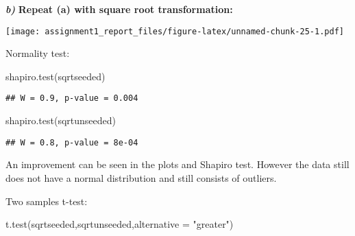 \documentclass[
]{article}
\newenvironment{Shaded}{\begin{snugshade}}{\end{snugshade}}
\newcommand{\AttributeTok}[1]{\textcolor[rgb]{0.77,0.63,0.00}{#1}}
\newcommand{\CommentTok}[1]{\textcolor[rgb]{0.56,0.35,0.01}{\textit{#1}}}
\newcommand{\FunctionTok}[1]{\textcolor[rgb]{0.00,0.00,0.00}{#1}}
\newcommand{\NormalTok}[1]{#1}
\newcommand{\OtherTok}[1]{\textcolor[rgb]{0.56,0.35,0.01}{#1}}
\newcommand{\SpecialCharTok}[1]{\textcolor[rgb]{0.00,0.00,0.00}{#1}}
\newcommand{\StringTok}[1]{\textcolor[rgb]{0.31,0.60,0.02}{#1}}
\begin{document}
\textbf{\emph{b)}} \textbf{Repeat (a) with square root transformation:}

\begin{Shaded}
\end{Shaded}

\texttt{[image: assignment1\_report\_files/figure-latex/unnamed-chunk-25-1.pdf]}

Normality test:

\begin{Shaded}
\begin{Highlighting}[]
\FunctionTok{shapiro.test}\NormalTok{(sqrtseeded)}
\end{Highlighting}
\end{Shaded}

\begin{verbatim}
## W = 0.9, p-value = 0.004
\end{verbatim}

\begin{Shaded}
\begin{Highlighting}[]
\FunctionTok{shapiro.test}\NormalTok{(sqrtunseeded)}
\end{Highlighting}
\end{Shaded}

\begin{verbatim}
## W = 0.8, p-value = 8e-04
\end{verbatim}

An improvement can be seen in the plots and Shapiro test. However the
data still does not have a normal distribution and still consists of
outliers.

Two samples t-test:

\begin{Shaded}
\begin{Highlighting}[]
\FunctionTok{t.test}\NormalTok{(sqrtseeded,sqrtunseeded,}\AttributeTok{alternative =} \StringTok{"greater"}\NormalTok{)}
\end{Highlighting}
\end{Shaded}
\end{document}
